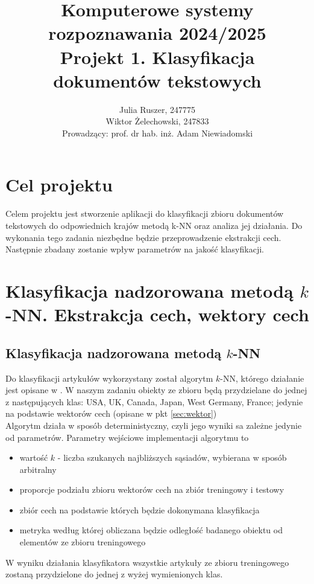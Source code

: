\documentclass{article}
\author{
	{Julia Ruszer, 247775} \\
	{Wiktor Żelechowski, 247833}\\ 
{Prowadzący: prof. dr hab. inż. Adam Niewiadomski}
}
\title{Komputerowe systemy rozpoznawania 2024/2025\\Projekt 1. Klasyfikacja dokumentów tekstowych}
\begin{document}
\maketitle



\section{Cel projektu}
Celem projektu jest stworzenie aplikacji do klasyfikacji zbioru dokumentów tekstowych \cite{reuters} do odpowiednich krajów metodą k-NN oraz analiza jej działania. Do wykonania tego zadania niezbędne będzie przeprowadzenie ekstrakcji cech. Następnie zbadany zostanie wpływ parametrów na jakość klasyfikacji.


\section{Klasyfikacja nadzorowana metodą $k$-NN.  Ekstrakcja cech, wektory cech}
\subsection{Klasyfikacja nadzorowana metodą $k$-NN}
Do klasyfikacji artykułów wykorzystany został algorytm $k$-NN, którego działanie jest opisane w \cite{tadeusiewicz90}. W naszym zadaniu obiekty ze zbioru \cite{reuters} będą przydzielane do jednej z następujących klas: USA, UK, Canada, Japan, West Germany, France; jedynie na podstawie wektorów cech (opisane w pkt \ref{sec:wektor}) \\
Algorytm działa w sposób deterministyczny, czyli jego wyniki sa zależne jedynie od parametrów.
Parametry wejściowe implementacji algorytmu to
\vspace{-2mm}
\begin{itemize} \itemsep1pt \parskip0pt 
  \item wartość $k$ - liczba szukanych najbliższych sąsiadów, wybierana w sposób arbitralny
  \item proporcje podziału zbioru wektorów cech na zbiór treningowy i testowy
  \item zbiór cech na podstawie których będzie dokonymana klasyfikacja
  \item metryka według której obliczana będzie odległość badanego obiektu od elementów ze zbioru treningowego
\end{itemize}\medskip
W wyniku działania klasyfikatora wszystkie artykuły ze zbioru treningowego zostaną przydzielone do jednej z wyżej wymienionych klas.
\end{document}

